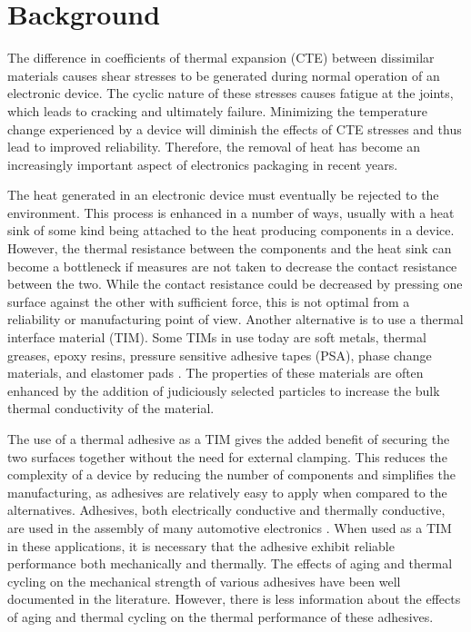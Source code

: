 \chapter{Background}

The difference in coefficients of thermal expansion (CTE) between dissimilar materials causes shear stresses to be generated during normal operation of an electronic device.  The cyclic nature of these stresses causes fatigue at the joints, which leads to cracking and ultimately failure.  Minimizing the temperature change experienced by a device will diminish the effects of CTE stresses and thus lead to improved reliability.  Therefore, the removal of heat has become an increasingly important aspect of electronics packaging in recent years.  

The heat generated in an electronic device must eventually be rejected to the environment.  This process is enhanced in a number of ways, usually with a heat sink of some kind being attached to the heat producing components in a device.  However, the thermal resistance between the components and the heat sink can become a bottleneck if measures are not taken to decrease the contact resistance between the two.  While the contact resistance could be decreased by pressing one surface against the other with sufficient force, this is not optimal from a reliability or manufacturing point of view.  Another alternative is to use a thermal interface material (TIM).  Some TIMs in use today are soft metals, thermal greases, epoxy resins, pressure sensitive adhesive tapes (PSA), phase change materials, and elastomer pads \cite{Gwinn2003,Nakayama2003}.  The properties of these materials are often enhanced by the addition of judiciously selected particles to increase the bulk thermal conductivity of the material.

The use of a thermal adhesive as a TIM gives the added benefit of securing the two surfaces together without the need for external clamping.  This reduces the complexity of a device by reducing the number of components and simplifies the manufacturing, as adhesives are relatively easy to apply when compared to the alternatives.  Adhesives, both electrically conductive and thermally conductive, are used in the assembly of many automotive electronics \cite{Murray2003}.  When used as a TIM in these applications, it is necessary that the adhesive exhibit reliable performance both mechanically and thermally.  The effects of aging \cite{Murray2003a} and thermal cycling \cite{Tuhus1993,Kwon2005,Eveloy2004,Eyman1997,Khuu2007} on the mechanical strength of various adhesives have been well documented in the literature.  However, there is less information about the effects of aging and thermal cycling on the thermal performance of these adhesives.  


